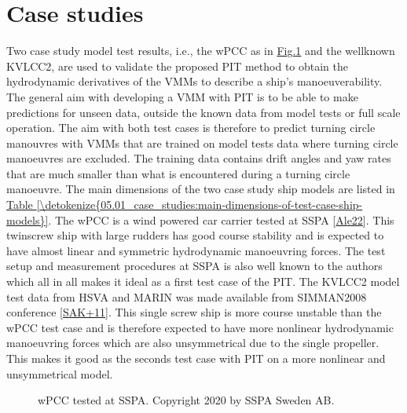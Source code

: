 \documentclass[review]{elsarticle}
\let\sphinxpxdimen\pdfpxdimen\else\newdimen\sphinxpxdimen
\begin{document}
\section{Case studies}
\label{\detokenize{05.01_case_studies:case-studies}}\label{\detokenize{05.01_case_studies:id1}}\label{\detokenize{05.01_case_studies::doc}}
\sphinxAtStartPar
Two case study model test results, i.e., the wPCC as in \hyperref[\detokenize{05.01_case_studies:wpcc-mdl}]{Fig.\@ \ref{\detokenize{05.01_case_studies:wpcc-mdl}}} and the well\sphinxhyphen{}known KVLCC2, are used to validate the proposed PIT method to obtain the hydrodynamic derivatives of the VMMs to describe a ship’s manoeuverability. The general aim with developing a VMM with PIT is to be able to make predictions for unseen data, outside the known data from model tests or full scale operation. The aim with both test cases is therefore to predict turning circle manouvres with VMMs that are trained on model tests data where turning circle manoeuvres are excluded. The training data contains drift angles and yaw rates that are much smaller than what is encountered during a turning circle manoeuvre.
The main dimensions of the two case study ship models are listed in \hyperref[\detokenize{05.01_case_studies:main-dimensions-of-test-case-ship-models}]{Table \ref{\detokenize{05.01_case_studies:main-dimensions-of-test-case-ship-models}}}. The wPCC is a wind powered car carrier tested at SSPA {[}\hyperlink{cite.bibligraphy:id86}{Ale22}{]}. This twin\sphinxhyphen{}screw ship with large rudders has good course stability and is expected to have almost linear and symmetric hydrodynamic manoeuvring forces. The test setup and measurement procedures at SSPA is also well known to the authors which all in all makes it ideal as a first test case of the PIT.
The KVLCC2 model test data from HSVA and MARIN was made available from SIMMAN2008 conference {[}\hyperlink{cite.bibligraphy:id79}{SAK+11}{]}. This single screw ship is more course unstable than the wPCC test case and is therefore expected to have more nonlinear hydrodynamic manoeuvring forces which are also unsymmetrical due to the single propeller. This makes it good as the seconds test case with PIT on a more nonlinear and unsymmetrical model.

\begin{figure}[H]
\centering
\capstart

\noindent\sphinxincludegraphics[height=150\sphinxpxdimen]{{wpcc_mdl}.png}
\caption{wPCC tested at SSPA. Copyright 2020 by SSPA Sweden AB.}\label{\detokenize{05.01_case_studies:wpcc-mdl}}\end{figure}
\end{document}
